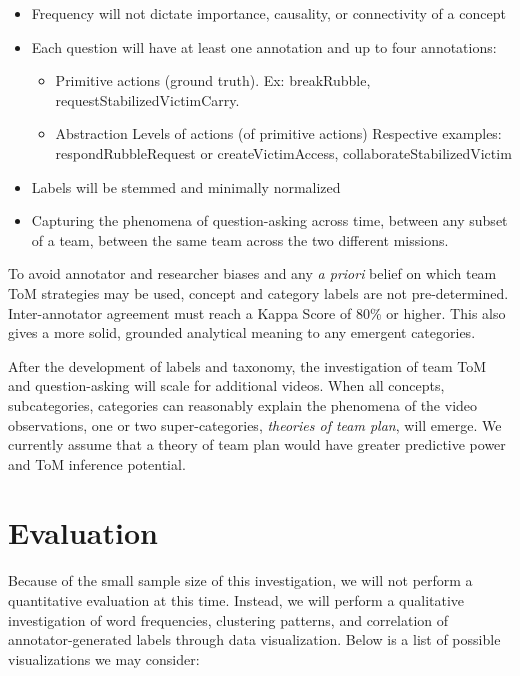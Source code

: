 \begin{itemize}
    \item Frequency will not dictate importance, causality, or connectivity of a concept
    \item Each question will have at least one annotation and up to four
      annotations:
    \begin{itemize}
        \item Primitive actions (ground truth). Ex: breakRubble,
          requestStabilizedVictimCarry.
        \item Abstraction Levels of actions (of primitive actions) Respective
          examples: respondRubbleRequest or createVictimAccess, collaborateStabilizedVictim
    \end{itemize}
    \item Labels will be stemmed and minimally normalized
    \item Capturing the phenomena of question-asking across time, between any subset of a team, between the same team across the two different missions. 
\end{itemize}


To avoid annotator and researcher biases and any \emph{a priori} belief on
which team ToM strategies may be used, concept and category labels are not
pre-determined. Inter-annotator agreement must reach a Kappa Score of 80\% or
higher. This also gives a more solid, grounded analytical meaning to any
emergent categories. 

After the development of labels and taxonomy, the investigation of team ToM and
question-asking will scale for additional videos. When all concepts,
subcategories, categories can reasonably explain the phenomena of the video
observations, one or two super-categories, \emph{theories of team plan}, will
emerge. We currently assume that a theory of team plan would have greater
predictive power and ToM inference potential. 


\section{Evaluation}

Because of the small sample size of this investigation, we will not perform a
quantitative evaluation at this time. Instead, we will perform a qualitative
investigation of word frequencies, clustering patterns, and correlation of
annotator-generated labels through data visualization. Below is a list of
possible visualizations we may consider:

